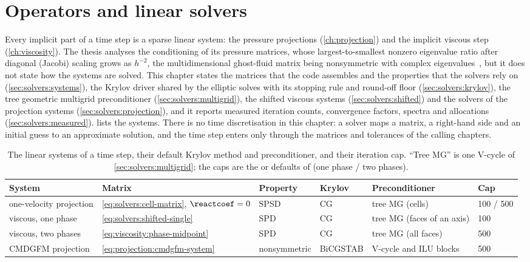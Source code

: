 \chapter{Operators and linear solvers}\label{ch:solvers}
Every implicit part of a time step is a sparse linear system: the pressure
projections (\cref{ch:projection}) and the implicit viscous step
(\cref{ch:viscosity}). The thesis analyses the conditioning of its
pressure matrices, whose largest-to-smallest nonzero eigenvalue ratio after
diagonal (Jacobi) scaling grows as $h^{-2}$, the multidimensional ghost-fluid
matrix being nonsymmetric with complex eigenvalues~, but it
does not state how the systems are solved. This chapter states the matrices
that the code assembles and the properties that the solvers rely on
(\cref{sec:solvers:systems}), the Krylov driver shared by the elliptic solves
with its stopping rule and round-off floor (\cref{sec:solvers:krylov}), the
tree geometric multigrid preconditioner (\cref{sec:solvers:multigrid}), the
shifted viscous systems (\cref{sec:solvers:shifted}) and the solvers of the
projection systems (\cref{sec:solvers:projection}), and it reports measured
iteration counts, convergence factors, spectra and allocations
(\cref{sec:solvers:measured}).  lists the systems.
There is no time discretisation in this chapter: a solver maps a matrix, a
right-hand side and an initial guess to an approximate solution, and the time
step enters only through the matrices and tolerances of the calling chapters.

\begin{table}[tbp]
  \centering\footnotesize
  \caption{The linear systems of a time step, their default Krylov method and
  preconditioner, and their iteration cap. ``Tree MG'' is one V-cycle of
  \cref{sec:solvers:multigrid}; the caps are the  or
   defaults of  (one phase / two phases).}
  \label{tab:solvers:systems}
  \begin{tabular}{@{}llllll@{}}
    \toprule
    System & Matrix & Property & Krylov & Preconditioner & Cap\\
    \midrule
    one-velocity projection & \cref{eq:solvers:cell-matrix}, $\reactcoef=0$ & SPSD & CG & tree MG (cells) & 100 / 500\\
    viscous, one phase & \cref{eq:solvers:shifted-single} & SPD & CG & tree MG (faces of an axis) & 100\\
    viscous, two phases & \cref{eq:viscosity:phase-midpoint} & SPD & CG & tree MG (all faces) & 500\\
    CMDGFM projection & \cref{eq:projection:cmdgfm-system} & nonsymmetric & BiCGSTAB & V-cycle and ILU blocks & 500\\
    \bottomrule
  \end{tabular}
\end{table}

